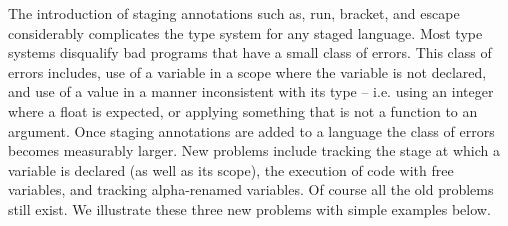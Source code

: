 \documentclass{sigplanconf}
\begin{document}
The introduction of staging annotations such as, run, bracket, and escape
considerably complicates the type system for any staged language. Most type
systems disqualify bad programs that have a small class of errors. This class
of errors includes, use of a variable in a scope where the variable is not
declared, and use of a value in a manner inconsistent with its type -- i.e.
using an integer where a float is expected, or applying something that is not
a function to an argument. Once staging annotations are added to a language
the class of errors becomes measurably larger.
New problems include tracking the stage at which a variable is declared
(as well as its scope), the execution of code with free variables, and
tracking alpha-renamed variables. Of course all the old problems still
exist. We illustrate these three new
problems with simple examples below.
\end{document}
